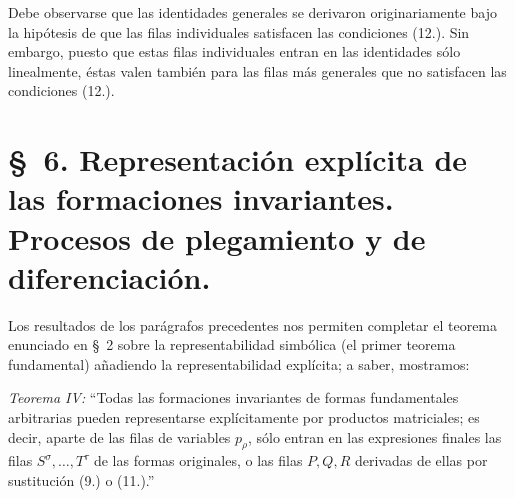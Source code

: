 \documentclass[11pt]{article}
\begin{document}
Debe observarse que las identidades generales se derivaron originariamente bajo la hipótesis de que las filas individuales satisfacen las condiciones (12.). Sin embargo, puesto que estas filas individuales entran en las identidades sólo linealmente, éstas valen también para las filas más generales que no satisfacen las condiciones (12.).

\section*{\S\ 6. Representación explícita de las formaciones invariantes.\\Procesos de plegamiento y de diferenciación.}
Los resultados de los parágrafos precedentes nos permiten completar el teorema enunciado en \S\ 2 sobre la representabilidad simbólica (el primer teorema fundamental) añadiendo la representabilidad explícita; a saber, mostramos:

\emph{Teorema IV:} ``Todas las formaciones invariantes de formas fundamentales arbitrarias pueden representarse explícitamente por productos matriciales; es decir, aparte de las filas de variables $p_\rho$, sólo entran en las expresiones finales las filas $S^\sigma,\ldots,T^\tau$ de las formas originales, o las filas $P,Q,R$ derivadas de ellas por sustitución (9.) o (11.).''
\end{document}
